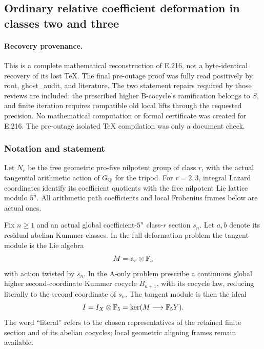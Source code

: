 \subsection{Ordinary relative coefficient deformation in classes two and three}

\paragraph{Recovery provenance.}
This is a complete mathematical reconstruction of E.216, not a byte-identical recovery of its lost TeX. The final pre-outage proof was fully read positively by root, ghost\_audit, and literature. The two statement repairs required by those reviews are included: the prescribed higher B-cocycle's ramification belongs to $S$, and finite iteration requires compatible old local lifts through the requested precision. No mathematical computation or formal certificate was created for E.216. The pre-outage isolated TeX compilation was only a document check.

\subsubsection*{Notation and statement}
Let $N_r$ be the free geometric pro-five nilpotent group of class $r$, with the actual tangential arithmetic action of $G_\mathbb Q$ for the tripod. For $r=2,3$, integral Lazard coordinates identify its coefficient quotients with the free nilpotent Lie lattice modulo $5^n$. All arithmetic path coefficients and local Frobenius frames below are actual ones.

Fix $n\ge1$ and an actual global coefficient-$5^n$ class-$r$ section $s_n$. Let $a,b$ denote its residual abelian Kummer classes. In the full deformation problem the tangent module is the Lie algebra
\[
 M=\mathfrak n_r\otimes\mathbb F_5
\]
with action twisted by $s_n$. In the A-only problem prescribe a continuous global higher second-coordinate Kummer cocycle $B_{n+1}$, with its cocycle law, reducing literally to the second coordinate of $s_n$. The tangent module is then the ideal
\[
 I=I_X\otimes\mathbb F_5=\ker(M\longrightarrow\mathbb F_5Y).
\]
The word ``literal'' refers to the chosen representatives of the retained finite section and of its abelian cocycles; local geometric aligning frames remain available.

